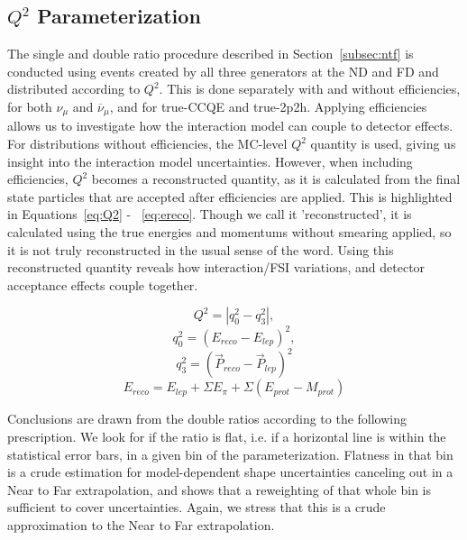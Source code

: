 \documentclass[12pt]{article}
\begin{document}
\subsection{$Q^2$ Parameterization}
\label{subsec:q2}
The single and double ratio procedure described in Section~\ref{subsec:ntf} is conducted using events created by all three generators at the ND and FD and distributed according to $Q^2$. This is done separately with and without efficiencies, for both $\nu_{\mu}$ and $\overline{\nu}_{\mu}$, and for true-CCQE and true-2p2h. Applying efficiencies allows us to investigate how the interaction model can couple to detector effects. For distributions without efficiencies, the MC-level $Q^2$ quantity is used, giving us insight into the interaction model uncertainties. However, when including efficiencies, $Q^2$ becomes a reconstructed quantity, as it is calculated from the final state particles that are accepted after efficiencies are applied. This is highlighted in Equations~\ref{eq:Q2} - ~\ref{eq:ereco}. Though we call it 'reconstructed', it is calculated using the true energies and momentums without smearing applied, so it is not truly reconstructed in the usual sense of the word. Using this reconstructed quantity reveals how interaction/FSI variations, and detector acceptance effects couple together.

\begin{equation}
\label{eq:Q2}
Q^2 = |q_0^2 - q_3^2|,
\end{equation}
\begin{equation}
\label{eq:q0}
q_0^2 = (E_{reco} - E_{lep})^2,
\end{equation}
\begin{equation}
\label{eq:q3}
q_3^2 = (\vec{P}_{reco} - \vec{P}_{lep})^2
\end{equation}
\begin{equation}
E_{reco} =E_{lep} + \Sigma E_{\pi} + \Sigma (E_{prot} - M_{prot})
\label{eq:ereco}
\end{equation}

Conclusions are drawn from the double ratios according to the following prescription. We look for if the ratio is flat, i.e. if a horizontal line is within the statistical error bars, in a given bin of the parameterization. Flatness in that bin is a crude estimation for model-dependent shape uncertainties canceling out in a Near to Far extrapolation, and shows that a reweighting of that whole bin is sufficient to cover uncertainties. Again, we stress that this is a crude approximation to the Near to Far extrapolation.
 
\end{document}
